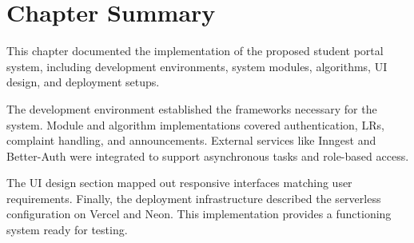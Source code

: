 \section{Chapter Summary}

This chapter documented the implementation of the proposed student portal system, including development environments, system modules, algorithms, UI design, and deployment setups.

The development environment established the frameworks necessary for the system. Module and algorithm implementations covered authentication, LRs, complaint handling, and announcements. External services like Inngest and Better-Auth were integrated to support asynchronous tasks and role-based access.

The UI design section mapped out responsive interfaces matching user requirements. Finally, the deployment infrastructure described the serverless configuration on Vercel and Neon. This implementation provides a functioning system ready for testing.
